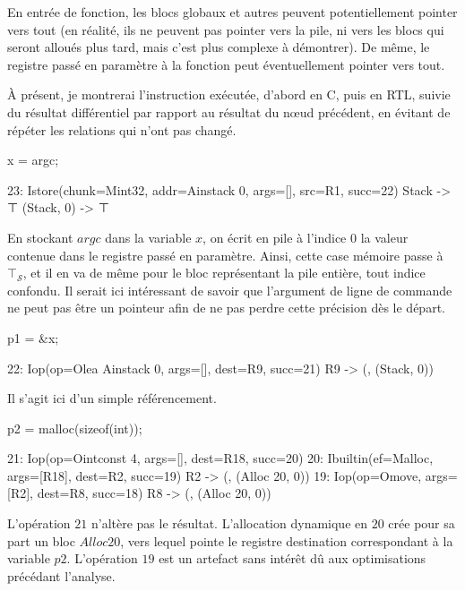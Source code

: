 \documentclass{article}
\newcommand\tS{\mathcal{S}}
\begin{document}
En entrée de fonction, les blocs globaux et autres peuvent potentiellement
pointer vers tout (en réalité, ils ne peuvent pas pointer vers la pile, ni vers
les blocs qui seront alloués plus tard, mais c'est plus complexe à démontrer).
De même, le registre passé en paramètre à la fonction peut éventuellement
pointer vers tout.

À présent, je montrerai l'instruction exécutée, d'abord en C, puis en RTL,
suivie du résultat différentiel par rapport au résultat du nœud précédent, en
évitant de répéter les relations qui n'ont pas changé.

\begin{cc}
x = argc;
\end{cc}
\begin{coq}
23: Istore(chunk=Mint32, addr=Ainstack 0, args=[], src=R1, succ=22)
Stack      -> ⊤
(Stack, 0) -> ⊤
\end{coq}

En stockant $argc$ dans la variable $x$, on écrit en pile à
l'indice $0$ la valeur contenue dans le registre passé en paramètre. Ainsi,
cette case mémoire passe à $\top_\tS$, et il en va de même pour le bloc
représentant la pile entière, tout indice confondu. Il serait ici intéressant
de savoir que l'argument de ligne de commande ne peut pas être un pointeur
afin de ne pas perdre cette précision dès le départ.

\begin{cc}
p1 = &x;
\end{cc}
\begin{coq}
22: Iop(op=Olea Ainstack 0, args=[], dest=R9, succ=21)
R9 -> ({}, {(Stack, 0)})
\end{coq}

Il s'agit ici d'un simple référencement.

\begin{cc}
p2 = malloc(sizeof(int));
\end{cc}
\begin{coq}
21: Iop(op=Ointconst 4, args=[], dest=R18, succ=20)
20: Ibuiltin(ef=Malloc, args=[R18], dest=R2, succ=19)
R2 -> ({}, {(Alloc 20, 0)})
19: Iop(op=Omove, args=[R2], dest=R8, succ=18)
R8 -> ({}, {(Alloc 20, 0)})
\end{coq}

L'opération $21$ n'altère pas le résultat. L'allocation dynamique
en $20$ crée pour sa part un bloc $Alloc 20$, vers
lequel pointe le registre destination correspondant à la variable $p2$.
L'opération $19$ est un artefact sans intérêt dû aux optimisations
précédant l'analyse.
\end{document}
